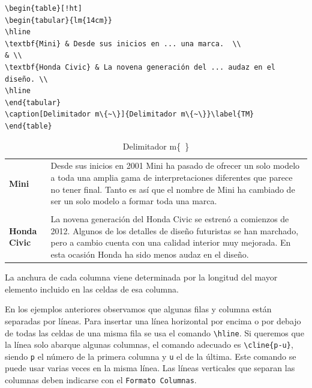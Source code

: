 \documentclass[10pt,a4paper]{article}
\begin{document}
\bigskip

\begin{verbatim}
\begin{table}[!ht]
\begin{tabular}{lm{14cm}}
\hline
\textbf{Mini} & Desde sus inicios en ... una marca.  \\
& \\
\textbf{Honda Civic} & La novena generación del ... audaz en el diseño. \\
\hline
\end{tabular}
\caption[Delimitador m\{~\}]{Delimitador m\{~\}}\label{TM}
\end{table}
\end{verbatim}

\bigskip

\begin{table}[!ht]
\begin{tabular}{lm{12cm}}
\hline
\textbf{Mini} & Desde sus inicios en 2001 Mini ha pasado de ofrecer un solo modelo a toda una amplia gama de interpretaciones diferentes que parece no tener final. Tanto es así que el nombre de Mini ha cambiado de ser un solo modelo a formar toda una marca.  \\
& \\
\textbf{Honda Civic} & La novena generación del Honda Civic se estrenó a comienzos de 2012. Algunos de los detalles de diseño futuristas se han marchado, pero a cambio cuenta con una calidad interior muy mejorada. En esta ocasión Honda ha sido menos audaz en el diseño. \\
\hline
\end{tabular}
\caption[Delimitador m\{~\}]{Delimitador m\{~\}}\label{TM}
\end{table}


\bigskip

La anchura de cada columna viene determinada por la longitud del mayor elemento incluido en las celdas de esa columna. 

\bigskip

En los ejemplos anteriores observamos que algunas filas y columna están separadas por líneas. Para insertar una línea horizontal por encima o por debajo de todas las celdas de una misma fila se usa el comando \verb/\hline/. Si queremos que la línea solo abarque algunas columnas, el comando adecuado es \verb/\cline{p-u}/, siendo \texttt{p} el número de la primera columna y \texttt{u} el de la última. Este comando se puede usar varias veces en la misma línea. Las líneas verticales que separan las columnas deben indicarse con el \texttt{Formato Columnas}.
\end{document}
